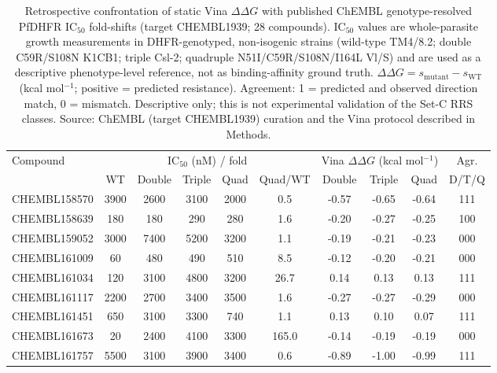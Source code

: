 \begin{landscape}
\begin{table}[htbp]
\centering
\scriptsize
\caption{Retrospective confrontation of static Vina $\Delta\Delta G$ with published ChEMBL genotype-resolved PfDHFR IC$_{50}$ fold-shifts (target CHEMBL1939; 28 compounds). IC$_{50}$ values are whole-parasite growth measurements in DHFR-genotyped, non-isogenic strains (wild-type TM4/8.2; double C59R/S108N K1CB1; triple Csl-2; quadruple N51I/C59R/S108N/I164L Vl/S) and are used as a descriptive phenotype-level reference, not as binding-affinity ground truth. $\Delta\Delta G = s_{\mathrm{mutant}} - s_{\mathrm{WT}}$ (kcal mol$^{-1}$; positive = predicted resistance). Agreement: 1 = predicted and observed direction match, 0 = mismatch. Descriptive only; this is not experimental validation of the Set-C RRS classes. Source: ChEMBL (target CHEMBL1939) curation and the Vina protocol described in Methods.}
\label{tab:s20_chembl_foldshift}
\begin{tabularx}{\linewidth}{@{}l c c c c c c c c c@{}}
\toprule
Compound & \multicolumn{5}{c}{IC$_{50}$ (nM) / fold} & \multicolumn{3}{c}{Vina $\Delta\Delta G$ (kcal mol$^{-1}$)} & Agr. \\
\cmidrule(lr){2-6}\cmidrule(lr){7-9}
 & WT & Double & Triple & Quad & Quad/WT & Double & Triple & Quad & D/T/Q \\
\midrule
CHEMBL158570 & 3900 & 2600 & 3100 & 2000 & 0.5 & -0.57 & -0.65 & -0.64 & 111 \\
CHEMBL158639 & 180 & 180 & 290 & 280 & 1.6 & -0.20 & -0.27 & -0.25 & 100 \\
CHEMBL159052 & 3000 & 7400 & 5200 & 3200 & 1.1 & -0.19 & -0.21 & -0.23 & 000 \\
CHEMBL161009 & 60 & 480 & 490 & 510 & 8.5 & -0.12 & -0.20 & -0.21 & 000 \\
CHEMBL161034 & 120 & 3100 & 4800 & 3200 & 26.7 & 0.14 & 0.13 & 0.13 & 111 \\
CHEMBL161117 & 2200 & 2700 & 3400 & 3500 & 1.6 & -0.27 & -0.27 & -0.29 & 000 \\
CHEMBL161451 & 650 & 3100 & 3300 & 740 & 1.1 & 0.13 & 0.10 & 0.07 & 111 \\
CHEMBL161673 & 20 & 2400 & 4100 & 3300 & 165.0 & -0.14 & -0.19 & -0.19 & 000 \\
CHEMBL161757 & 5500 & 3100 & 3900 & 3400 & 0.6 & -0.89 & -1.00 & -0.99 & 111 \\

\end{tabularx}
\end{table}
\end{landscape}
